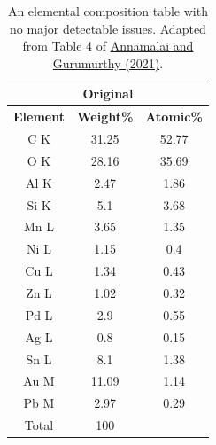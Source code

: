 \documentclass[letterpaper, 12pt]{article}
\begin{document}
\bgroup
\begin{table}[h!tbp]
\def\arraystretch{1.4}
\centering
\begin{tabular}{|ccc|}
\hline
\multicolumn{3}{|c|}{\textbf{Original}}                                                           \\ \hline
\multicolumn{1}{|c|}{\textbf{Element}} & \multicolumn{1}{c|}{\textbf{Weight\%}} & \textbf{Atomic\%} \\ \hline
\multicolumn{1}{|c|}{C K}              & \multicolumn{1}{c|}{31.25}            & 52.77            \\ \hline
\multicolumn{1}{|c|}{O K}              & \multicolumn{1}{c|}{28.16}            & 35.69            \\ \hline
\multicolumn{1}{|c|}{Al K}             & \multicolumn{1}{c|}{2.47}             & 1.86             \\ \hline
\multicolumn{1}{|c|}{Si K}             & \multicolumn{1}{c|}{5.1}              & 3.68             \\ \hline
\multicolumn{1}{|c|}{Mn L}             & \multicolumn{1}{c|}{3.65}             & 1.35             \\ \hline
\multicolumn{1}{|c|}{Ni L}             & \multicolumn{1}{c|}{1.15}             & 0.4              \\ \hline
\multicolumn{1}{|c|}{Cu L}             & \multicolumn{1}{c|}{1.34}             & 0.43             \\ \hline
\multicolumn{1}{|c|}{Zn L}             & \multicolumn{1}{c|}{1.02}             & 0.32             \\ \hline
\multicolumn{1}{|c|}{Pd L}             & \multicolumn{1}{c|}{2.9}              & 0.55             \\ \hline
\multicolumn{1}{|c|}{Ag L}             & \multicolumn{1}{c|}{0.8}              & 0.15             \\ \hline
\multicolumn{1}{|c|}{Sn L}             & \multicolumn{1}{c|}{8.1}              & 1.38             \\ \hline
\multicolumn{1}{|c|}{Au M}             & \multicolumn{1}{c|}{11.09}            & 1.14             \\ \hline
\multicolumn{1}{|c|}{Pb M}             & \multicolumn{1}{c|}{2.97}             & 0.29             \\ \hline
\multicolumn{1}{|c|}{Total}            & \multicolumn{1}{c|}{100}              &                  \\ \hline
\end{tabular}
\caption*{An elemental composition table with no major detectable issues. Adapted from Table 4 of \href{https://doi.org/10.1080/10962247.2020.1813836}{Annamalai and Gurumurthy (2021)}.}
\end{table}
\egroup
\end{document}
